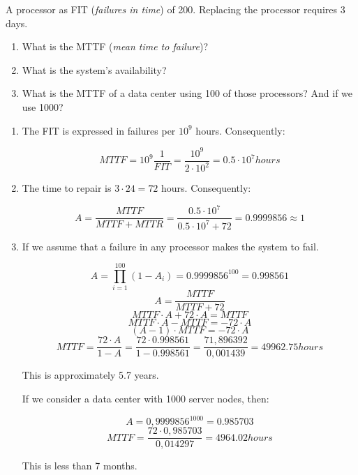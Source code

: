 \begin{acexercise}\end{acexercise}

A processor as FIT (\emph{failures in time}) of 200. Replacing the processor requires 3 days.

\begin{enumerate}

\item What is the MTTF (\emph{mean time to failure})?

\item What is the system's availability?

\item What is the MTTF of a data center using 100 of those processors? And if we use 1000?

\end{enumerate}

\begin{acsolution}\end{acsolution}

\begin{enumerate}

\item The FIT is expressed in failures per $10^9$ hours. Consequently:

\[MTTF = 10^9 \frac{1}{FIT} = \frac{10^9}{2 \cdot 10^2} = 0.5 \cdot 10^7 hours\]

\item The time to repair is $3 \cdot 24 = 72$ hours. Consequently:

\[
A = \frac{MTTF}{MTTF + MTTR} =
\frac{0.5 \cdot 10^7}{0.5 \cdot 10^7 + 72} =
0.9999856 \approx 1
\]

\item If we assume that a failure in any processor makes the system to fail.

\[
A = \prod_{i=1}^{100}(1 - A_i) = 0.9999856^{100} = 0.998561
\]
\[A = \frac{MTTF}{MTTF + 72} \]
\[MTTF \cdot A + 72 \cdot A = MTTF\]
\[MTTF \cdot A - MTTF = - 72 \cdot A\]
\[(A-1) \cdot MTTF = - 72 \cdot A\]
\[MTTF = \frac{72 \cdot A}{1 - A} = \frac{72 \cdot 0.998561}{1-0.998561} =
\frac{71,896392}{0,001439} =
49962.75 hours
\]

This is approximately 5.7 years.

If we consider a data center with 1000 server nodes, then:

\[A = 0,9999856^{1000} = 0.985703\]
\[MTTF = \frac{72 \cdot 0,985703}{0,014297} = 4964.02 hours\]

This is less than 7 months.

\end{enumerate}

